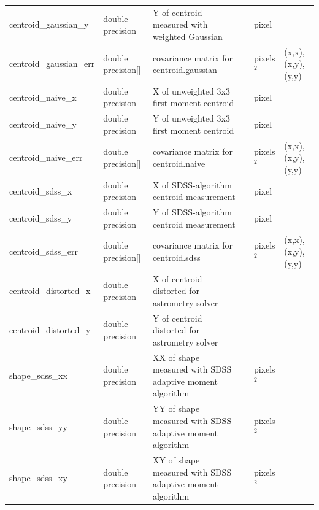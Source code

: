 \documentclass[12pt]{article}
\begin{document}
\begin{table}[thbp]
\begin{center}
{\begin{tabular}{llllll}
centroid\_gaussian\_y & double precision & Y of centroid measured with weighted Gaussian            &                           & pixel            &             \\
centroid\_gaussian\_err & double precision[] & covariance matrix for centroid.gaussian                  &                           & pixels$^2$         & {(x,x), (x,y), (y,y)}  \\
centroid\_naive\_x & double precision & X of unweighted 3x3 first moment centroid                &                           & pixel            &             \\
centroid\_naive\_y & double precision & Y of unweighted 3x3 first moment centroid                &                           & pixel            &             \\
centroid\_naive\_err & double precision[] & covariance matrix for centroid.naive                     &                           & pixels$^2$         & {(x,x), (x,y), (y,y)}  \\
centroid\_sdss\_x & double precision & X of SDSS-algorithm centroid measurement                 &                           & pixel            &             \\
centroid\_sdss\_y & double precision & Y of SDSS-algorithm centroid measurement                 &                           & pixel            &             \\
centroid\_sdss\_err & double precision[] & covariance matrix for centroid.sdss                      &                           & pixels$^2$         & {(x,x), (x,y), (y,y)}  \\
centroid\_distorted\_x & double precision & X of centroid distorted for astrometry solver            &                           &                  &             \\
centroid\_distorted\_y & double precision & Y of centroid distorted for astrometry solver            &                           &                  &             \\
shape\_sdss\_xx & double precision & XX of shape measured with SDSS adaptive moment algorithm  &                           & pixels$^2$         &             \\
shape\_sdss\_yy & double precision & YY of shape measured with SDSS adaptive moment algorithm  &                           & pixels$^2$         &             \\
shape\_sdss\_xy & double precision & XY of shape measured with SDSS adaptive moment algorithm  &                           & pixels$^2$         &             \\

\end{tabular}}
\end{center}
\end{table}
\end{document}
